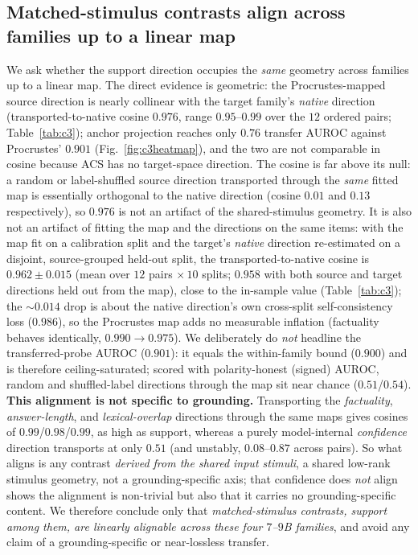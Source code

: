 \subsection{Matched-stimulus contrasts align across families up to a linear map}
\label{sec:c3}
We ask whether the support direction occupies the \emph{same} geometry across
families up to a linear map. The direct evidence is geometric: the Procrustes-mapped
source direction is nearly collinear with the target family's \emph{native} direction
(transported-to-native cosine $0.976$, range $0.95$--$0.99$ over the $12$ ordered
pairs; Table~\ref{tab:c3}); anchor projection reaches only $0.76$ transfer AUROC
against Procrustes' $0.901$ (Fig.~\ref{fig:c3heatmap}), and the two are not comparable
in cosine because ACS has no target-space direction. The cosine is far above its
null: a random or label-shuffled source direction transported through the \emph{same}
fitted map is essentially orthogonal to the native direction (cosine $0.01$ and $0.13$
respectively), so $0.976$ is not an artifact of the shared-stimulus geometry. It is
also not an artifact of fitting the map and the directions on the same items: with the
map fit on a calibration split and the target's \emph{native} direction re-estimated on
a disjoint, source-grouped held-out split, the transported-to-native cosine is
$0.962{\pm}0.015$ (mean over $12$ pairs ${\times}\,10$ splits; $0.958$ with both source
and target directions held out from the map), close to the in-sample
value (Table~\ref{tab:c3}); the ${\sim}0.014$ drop is about the native direction's own
cross-split self-consistency loss ($0.986$), so
the Procrustes map adds no measurable inflation (factuality behaves identically,
$0.990{\to}0.975$). We
deliberately do \emph{not} headline the transferred-probe AUROC ($0.901$): it equals
the within-family bound ($0.900$) and is therefore ceiling-saturated; scored with
polarity-honest (signed) AUROC, random and shuffled-label directions through the map
sit near chance ($0.51$/$0.54$). \textbf{This alignment is not specific to grounding.}
Transporting the \emph{factuality}, \emph{answer-length}, and \emph{lexical-overlap}
directions through the same maps gives cosines of $0.99$/$0.98$/$0.99$, as high as
support, whereas a purely model-internal \emph{confidence} direction transports at
only $0.51$ (and unstably, $0.08$--$0.87$ across pairs). So what aligns is any contrast
\emph{derived from the shared input stimuli}, a shared low-rank stimulus geometry, not
a grounding-specific axis; that confidence does \emph{not} align shows the alignment is
non-trivial but also that it carries no grounding-specific content. We therefore
conclude only that \emph{matched-stimulus contrasts, support among them, are linearly
alignable across these four $7$--$9$B families}, and avoid any claim of a
grounding-specific or near-lossless transfer.

